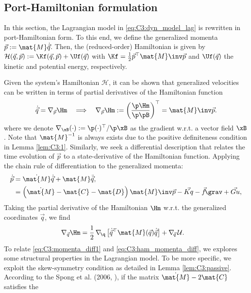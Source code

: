 \subsection{Port-Hamiltonian formulation}
In this section, the Lagrangian model in \eqref{eq:C3:dyn_model_lag} is rewritten in port-Hamiltonian form. To this end, we define the generalized momenta $\vec{p} := \mat{M} \dot{\vec{q}}$. Then, the (reduced-order) Hamiltonian is given by $\mathcal{H}(\vec{q},\vec{p}) := \Kf(\vec{q},\vec{p}) + \Uf(\vec{q})$ with $\Kf = \frac{1}{2} \vec{p}^\top \mat{M}\inv \vec{p}$ and $\Uf(\vec{q})$ the kinetic and potential energy, respectively.

Given the system's Hamiltonian $\mathcal{H}$, it can be shown that generalized velocities can be written in terms of partial derivatives of the Hamiltonian function
%
\begin{equation}
\dot{\vec{q}} = \nabla_{\vec{p}} \Hm \quad \Longrightarrow  \quad \nabla_{\vec{p}} \Hm := \left(\frac{\p \Hm}{\p \pB} \right)^\top= \mat{M}\inv \vec{p}.
\label{eq:C3:state_diff}
\end{equation}
%
where we denote $\nabla_{\xB}(\cdot) := \p (\cdot)^\top/\p \xB$ as the gradient w.r.t. a vector field $\xB$. Note that $\mat{M}^{-1}$ is always exists due to the positive definiteness condition in Lemma \ref{lem:C3:1}. Similarly, we seek a differential description that relates the time evolution of $\vec{p}$ to a state-derivative of the Hamiltonian function. Applying the chain rule of differentiation to the generalized momenta:
%
\begin{align}
\dot{\vec{p}} & = \dot{\mat{M}}\dot{\vec{q}} + \mat{M}\ddot{\vec{q}},\notag \\
& = \left(\dot{\mat{M}} - \mat{C} - \mat{D} \right) \mat{M}\inv \vec{p} - \vec{Kq} - \vec{f}\!\grav + \vec{Gu}
\label{eq:C3:momenta_diff1},
\end{align}
%
Taking the partial derivative of the Hamiltonian $\Hm$ w.r.t. the generalized coordinates $\vec{q}$, we find
\begin{align}
\nabla_{\vec{q}} \Hm & = \frac{1}{2} \,\nabla_{\!\q} \left[ \dot{\vec{q}}^\top \mat{M}(\vec{q}) \dot{\vec{q}} \right] + \nabla_{\!\vec{q}}\, \mathcal{U}.
\label{eq:C3:ham_momenta_diff}
\end{align}
%
To relate \eqref{eq:C3:momenta_diff1} and \eqref{eq:C3:ham_momenta_diff}, we explores some structural properties in the Lagrangian model. To be more specific, we exploit the skew-symmetry condition as detailed in Lemma \ref{lem:C3:passive}. According to the Spong et al. (2006, \cite{Spong2006}), if the matrix $\dot{\mat{M}} - 2\mat{C}$ satisfies the
